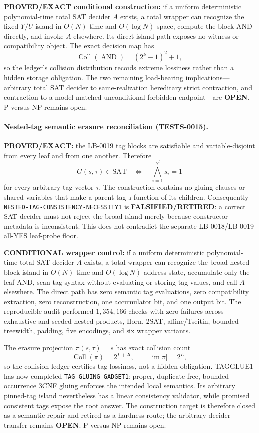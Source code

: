 \documentclass[11pt]{article}
\begin{document}
\textbf{PROVED/EXACT conditional construction:} if a uniform deterministic polynomial-time total SAT decider \(A\) exists, a total wrapper can recognize the fixed \(Y/U\) island in \(O(N)\) time and \(O(\log N)\) space, compute the block AND directly, and invoke \(A\) elsewhere.  Its direct island path exposes no witness or compatibility object.  The exact decision map has
\[
 \operatorname{Coll}(\operatorname{AND})= (2^k-1)^2+1,
\]
so the ledger's collision distribution records extreme lossiness rather than a hidden storage obligation.  The two remaining load-bearing implications---arbitrary total SAT decider to same-realization hereditary strict contraction, and contraction to a model-matched unconditional forbidden endpoint---are \textbf{OPEN}.  P versus NP remains open.


\paragraph{Nested-tag semantic erasure reconciliation (TESTS-0015).}
\textbf{PROVED/EXACT:} the LB-0019 tag blocks are satisfiable and variable-disjoint from every leaf and from one another.  Therefore
\[
 G(s,\tau)\in\mathrm{SAT}\quad\Longleftrightarrow\quad
 \bigwedge_{i=1}^{b^d}s_i=1
\]
for every arbitrary tag vector \(\tau\).  The construction contains no gluing
clauses or shared variables that make a parent tag a function of its children.
Consequently \texttt{NESTED-TAG-CONSISTENCY-NECESSITY1} is
\textbf{FALSIFIED/RETIRED}: a correct SAT decider must not reject the broad
island merely because constructor metadata is inconsistent.  This does not
contradict the separate LB-0018/LB-0019 all-YES leaf-probe floor.

\textbf{CONDITIONAL wrapper control:} if a uniform deterministic
polynomial-time total SAT decider \(A\) exists, a total wrapper can recognize
the broad nested-block island in \(O(N)\) time and \(O(\log N)\) address state,
accumulate only the leaf AND, scan tag syntax without evaluating or storing tag
values, and call \(A\) elsewhere.  The direct path has zero semantic tag
evaluations, zero compatibility extraction, zero reconstruction, one
accumulator bit, and one output bit.  The reproducible audit performed
\(1{,}354{,}166\) checks with zero failures across exhaustive and seeded
nested products, Horn, 2SAT, affine/Tseitin, bounded-treewidth, padding,
five encodings, and six wrapper variants.

The erasure projection \(\pi(s,\tau)=s\) has exact collision count
\[
 \operatorname{Coll}(\pi)=2^{L+2I},\qquad |\operatorname{im}\pi|=2^L,
\]
so the collision ledger certifies tag lossiness, not a hidden obligation.
TAGGLUE1 has now completed \texttt{TAG-GLUING-GADGET1}: proper,
duplicate-free, bounded-occurrence 3CNF gluing enforces the intended local
semantics. Its arbitrary pinned-tag island nevertheless has a linear
consistency validator, while promised consistent tags expose the root answer.
The construction target is therefore closed as a semantic repair and retired
as a hardness route; the arbitrary-decider transfer remains \textbf{OPEN}.  P versus NP remains open.
\end{document}
